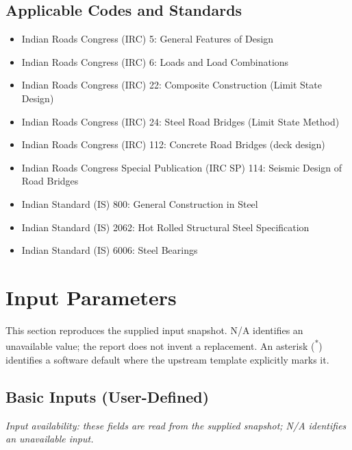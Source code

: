 \documentclass[12pt,a4paper]{report}
\numberwithin{table}{chapter}
\numberwithin{figure}{chapter}
\newcommand{\sdstar}{\textsuperscript{*}}
\newcommand{\ReportCaptionSetup}{%
  \setlength{\abovecaptionskip}{5pt}\setlength{\belowcaptionskip}{5pt}}
\begin{document}
\section{Applicable Codes and Standards}
\label{sec:codes}

\begin{itemize}
\item Indian Roads Congress (IRC) 5: General Features of Design
\item Indian Roads Congress (IRC) 6: Loads and Load Combinations
\item Indian Roads Congress (IRC) 22: Composite Construction (Limit State Design)
\item Indian Roads Congress (IRC) 24: Steel Road Bridges (Limit State Method)
\item Indian Roads Congress (IRC) 112: Concrete Road Bridges (deck design)
\item Indian Roads Congress Special Publication (IRC SP) 114: Seismic Design of Road Bridges
\item Indian Standard (IS) 800: General Construction in Steel
\item Indian Standard (IS) 2062: Hot Rolled Structural Steel Specification
\item Indian Standard (IS) 6006: Steel Bearings
\end{itemize}


\chapter{Input Parameters}
\ReportCaptionSetup


This section reproduces the supplied input snapshot. N/A identifies an unavailable value; the report does not invent a replacement. An asterisk (\sdstar{}) identifies a software default where the upstream template explicitly marks it.

\section{Basic Inputs (User-Defined)}
\label{sec:basic-inputs}

\noindent\textit{Input availability: these fields are read from the supplied snapshot; N/A identifies an unavailable input.}
\end{document}
